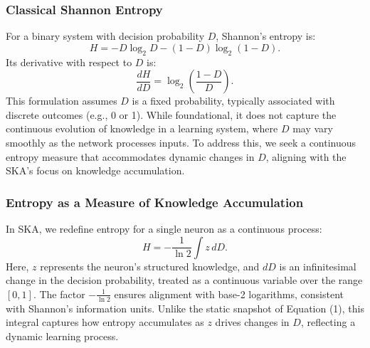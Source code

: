 \documentclass{article}
\begin{document}
\subsubsection{Classical Shannon Entropy}
For a binary system with decision probability \( D \), Shannon’s entropy is:
\begin{equation}
	H = -D \log_2 D - (1 - D) \log_2 (1 - D).
\end{equation}
Its derivative with respect to \( D \) is:
\begin{equation}
	\frac{dH}{dD} = \log_2 \left( \frac{1 - D}{D} \right).
\end{equation}
This formulation assumes \( D \) is a fixed probability, typically associated with discrete outcomes (e.g., 0 or 1). While foundational, it does not capture the continuous evolution of knowledge in a learning system, where \( D \) may vary smoothly as the network processes inputs. To address this, we seek a continuous entropy measure that accommodates dynamic changes in \( D \), aligning with the SKA’s focus on knowledge accumulation.

\subsubsection{Entropy as a Measure of Knowledge Accumulation}\label{contentropy}
In SKA, we redefine entropy for a single neuron as a continuous process:
\begin{equation}
	H = -\frac{1}{\ln 2} \int z \, dD.
\end{equation}
Here, \( z \) represents the neuron’s structured knowledge, and \( dD \) is an infinitesimal change in the decision probability, treated as a continuous variable over the range \( [0, 1] \). The factor \( -\frac{1}{\ln 2} \) ensures alignment with base-2 logarithms, consistent with Shannon’s information units. Unlike the static snapshot of Equation (1), this integral captures how entropy accumulates as \( z \) drives changes in \( D \), reflecting a dynamic learning process.
\end{document}
